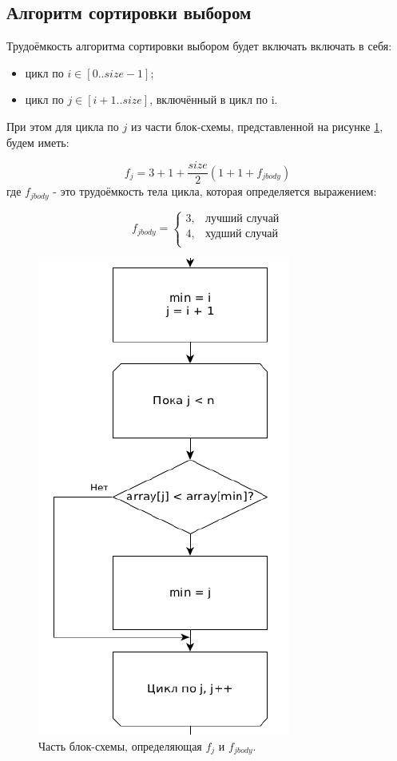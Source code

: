 \documentclass[12pt]{report}
\begin{document}
\subsection{Алгоритм сортировки выбором}
Трудоёмкость алгоритма сортировки выбором будет включать включать в себя:
\begin{itemize}
\item цикл по $i \in [0..size - 1]$;
\item цикл по $j \in [i + 1..size]$, включённый в цикл по i.
\end{itemize}

При этом для цикла по $j$ из части блок-схемы, представленной на рисунке \ref{img:selection:fj}, будем иметь:

\begin{equation}
f_{j} = 3 + 1 + \frac{size}{2}(1 + 1 + f_{jbody})
\end{equation}
где $f_{jbody}$ - это трудоёмкость тела цикла, которая определяется выражением:

\begin{equation}
f_{jbody} = \begin{cases}
				3, & \textbf{лучший случай}\\
				4, & \textbf{худший случай}\\
				\end{cases}
\end{equation}

\begin{figure}
\begin{center}
\includegraphics[scale=0.4]{inc/img/selectionfj.png}
\captionsetup{justification=centering}
	\caption{Часть блок-схемы, определяющая $f_{j}$ и $f_{j body}$.}
	\label{img:selection:fj}	
\end{center}
\end{figure}
\end{document}
